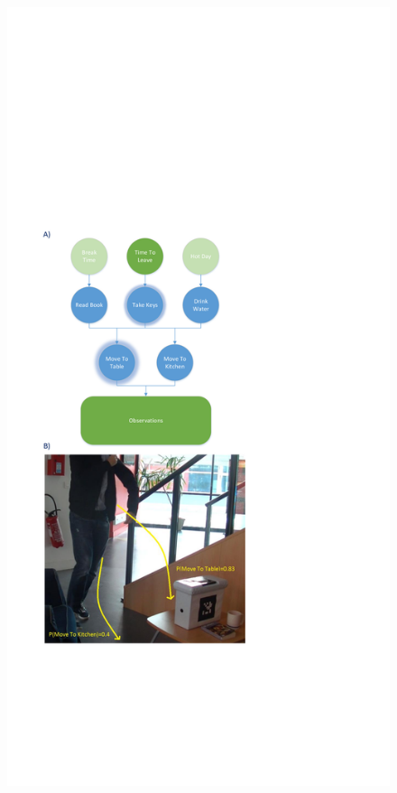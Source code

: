 \documentclass[a4paper,11pt,twoside]{StyleThese}
\begin{document}


\vspace{-10pt}

 \begin{figure}[h!]
	\centering
	\includegraphics[trim={2cm 11cm 11cm 17cm},clip,scale=0.56]{img/cookieScenario.pdf}

\end{figure}
\end{document}
